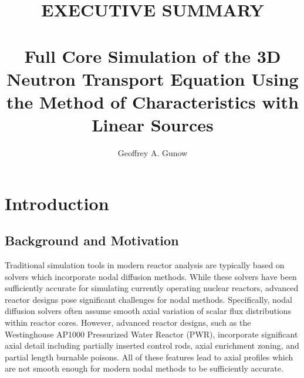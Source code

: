 \documentclass[12pt,twoside]{mitthesis-exec}
\begin{document}



\title{EXECUTIVE SUMMARY \\~\\ Full Core Simulation of the 3D Neutron Transport Equation Using the Method of Characteristics with Linear Sources}

\author{Geoffrey A. Gunow}








\singlespacing 

\section*{Introduction}

\subsection*{Background and Motivation}

Traditional simulation tools in modern reactor analysis are typically based on solvers which incorporate nodal diffusion methods. While these solvers have been sufficiently accurate for simulating currently operating nuclear reactors, advanced reactor designs pose significant challenges for nodal methods. Specifically, nodal diffusion solvers often assume smooth axial variation of scalar flux distributions within reactor cores. However, advanced reactor designs, such as the Westinghouse AP1000 Pressurized Water Reactor (PWR), incorporate significant axial detail including partially inserted control rods, axial enrichment zoning, and partial length burnable poisons. All of these features lead to axial profiles which are not smooth enough for modern nodal methods to be sufficiently accurate.
\end{document}
